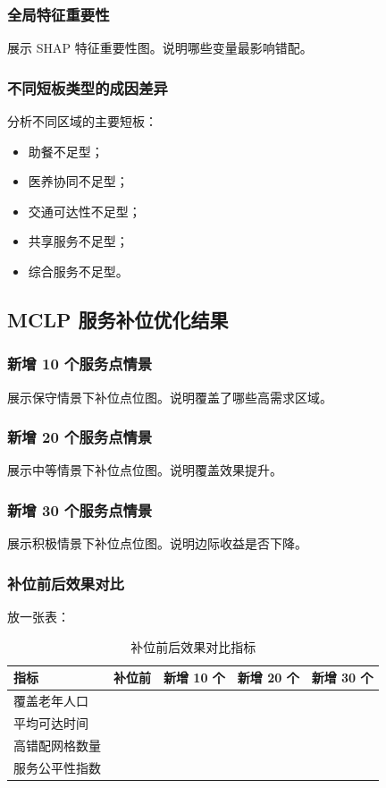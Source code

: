 \documentclass[UTF8,zihao=-4,a4paper,fontset=none]{ctexart}
\begin{document}
\subsubsection{全局特征重要性}

展示 SHAP 特征重要性图。说明哪些变量最影响错配。

\subsubsection{不同短板类型的成因差异}

分析不同区域的主要短板：

\begin{itemize}
\item 助餐不足型；
\item 医养协同不足型；
\item 交通可达性不足型；
\item 共享服务不足型；
\item 综合服务不足型。
\end{itemize}

\subsection{MCLP 服务补位优化结果}

\subsubsection{新增 10 个服务点情景}

展示保守情景下补位点位图。说明覆盖了哪些高需求区域。

\subsubsection{新增 20 个服务点情景}

展示中等情景下补位点位图。说明覆盖效果提升。

\subsubsection{新增 30 个服务点情景}

展示积极情景下补位点位图。说明边际收益是否下降。

\subsubsection{补位前后效果对比}

放一张表：

\begin{table}[H]
\centering
\caption{补位前后效果对比指标}
\begin{tabular}{lllll}
\toprule
\rowcolor{tablehead}
指标 & 补位前 & 新增 10 个 & 新增 20 个 & 新增 30 个 \\
\midrule
覆盖老年人口 &  &  &  &  \\
平均可达时间 &  &  &  &  \\
高错配网格数量 &  &  &  &  \\
服务公平性指数 &  &  &  &  \\
\bottomrule
\end{tabular}
\end{table}
\end{document}
